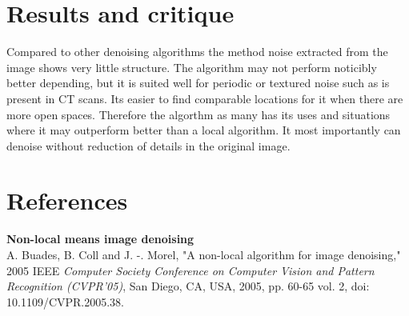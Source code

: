 \documentclass[12pt, letterpaper]{article}
\begin{document}
\section{Results and critique}
Compared to other denoising algorithms the method noise extracted from the image shows very little structure. The algorithm may not perform noticibly better depending, but it is suited well for periodic or textured noise such as is present in CT scans. Its easier to find comparable locations for it when there are more open spaces. Therefore the algorthm as many has its uses and situations where it may outperform better than a local algorithm. It most importantly can denoise without reduction of details in the original image.



\section*{References}
\textbf{Non-local means image denoising}\\
A. Buades, B. Coll and J. -. Morel, "A non-local algorithm for image denoising," 2005 IEEE \textit{Computer Society Conference on Computer Vision and Pattern Recognition (CVPR'05)}, San Diego, CA, USA, 2005, pp. 60-65 vol. 2, doi: 10.1109/CVPR.2005.38.
\end{document}
